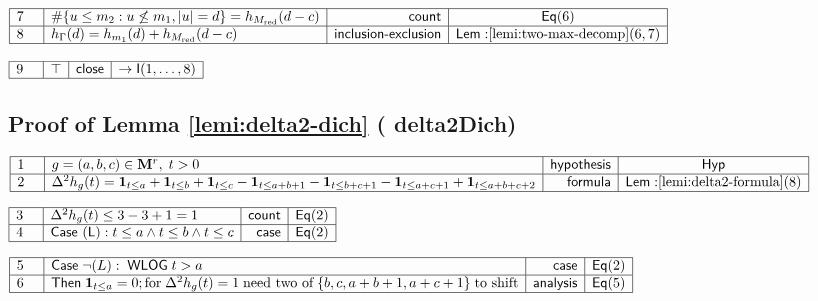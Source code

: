\documentclass[11pt,reqno]{amsart}
\begin{document}
\nointerlineskip\noindent$%
\begin{array}{|m{0.5cm}|l|r|c|}
\hline
7 & \#\{u\le m_{2}:u\not\le m_{1},|u|=d\}=h_{M_{\mathrm{red}}}(d-c) & 
\mathsf{count} & \mathsf{Eq}(6) \\ \hline
8 & h_{\Gamma}(d)=h_{m_{1}}(d)+h_{M_{\mathrm{red}}}(d-c) & \mathsf{inclusion%
\text{-}exclusion} & \mathsf{Lem:}\ref{lemi:two-max-decomp}(6,7) \\ \hline
\end{array}%
$

\nointerlineskip\noindent$%
\begin{array}{|m{0.5cm}|l|r|c|}
\hline
9 & \top & \mathsf{close} & \to\mathsf{I}(1,\dots,8) \\ \hline
\end{array}%
$

\medskip

\subsection*{Proof of Lemma \protect\ref{lemi:delta2-dich} (\textsf{%
delta2Dich})}

\noindent $%
\begin{array}{|m{0.5cm}|l|r|c|}
\hline
1 & g=(a,b,c)\in \mathbf{M}^{r},\;t>0 & \mathsf{hypothesis} & \mathsf{Hyp}
\\ \hline
2 & \Delta ^{2}h_{g}(t)=\mathbf{1}_{t\leq a}+\mathbf{1}_{t\leq b}+\mathbf{1}%
_{t\leq c}-\mathbf{1}_{t\leq a+b+1}-\mathbf{1}_{t\leq b+c+1}-\mathbf{1}%
_{t\leq a+c+1}+\mathbf{1}_{t\leq a+b+c+2} & \mathsf{formula} & \mathsf{Lem:}%
\ref{lemi:delta2-formula}(8) \\ \hline
\end{array}%
$

\nointerlineskip\noindent$%
\begin{array}{|m{0.5cm}|l|r|c|}
\hline
3 & \Delta^{2}h_{g}(t)\le3-3+1=1 & \mathsf{count} & \mathsf{Eq}(2) \\ \hline
4 & \mathsf{Case\ (L):}\;t\le a\wedge t\le b\wedge t\le c & \mathsf{case} & 
\mathsf{Eq}(2) \\ \hline
\end{array}%
$

\nointerlineskip\noindent$%
\begin{array}{|m{0.5cm}|l|r|c|}
\hline
5 & \mathsf{Case}\;\neg(L):\;\mathsf{WLOG}\;t>a & \mathsf{case} & \mathsf{Eq}%
(2) \\ \hline
6 & \mathsf{Then}\;\mathbf{1}_{t\le a}=0;\text{for}\;\Delta^{2}h_{g}(t)=1\;%
\text{need two of}\;\{b,c,a+b+1,a+c+1\}\;\text{to shift} & \mathsf{analysis}
& \mathsf{Eq}(5) \\ \hline
\end{array}%
$
\end{document}
